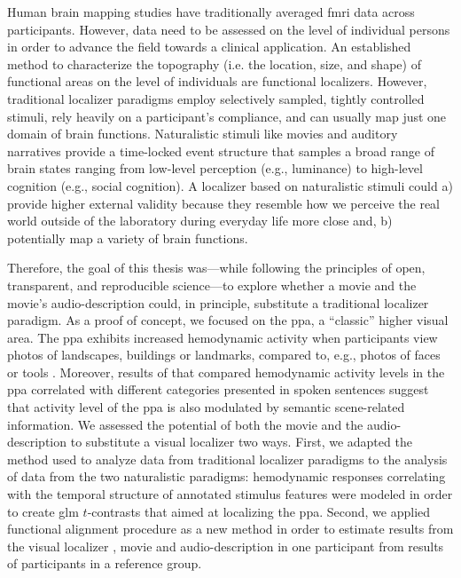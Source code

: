 

Human brain mapping studies have traditionally averaged \ac{fmri} data across
participants.
%
However, data need to be assessed on the level of individual persons in order to
advance the field towards a clinical application.
An established method to characterize the topography (i.e. the location, size,
and shape) of functional areas on the level of individuals are functional
localizers.
However, traditional localizer paradigms employ selectively sampled, tightly
controlled stimuli, rely heavily on a participant's compliance, and can usually
map just one domain of brain functions.
Naturalistic stimuli like movies and auditory narratives \citep[cf.][for
reviews]{jaaskelainen2021movies, jaaskelainen2020neural} provide a time-locked
event structure that samples a broad range of brain states ranging from
low-level perception (e.g., luminance) to high-level cognition (e.g., social
cognition).
%
A localizer based on naturalistic stimuli could
%
a) provide higher external validity because they resemble how we perceive the
real world outside of the laboratory during everyday life more close and,
%
b) potentially map a variety of brain functions.

Therefore, the goal of this thesis was---while following the principles of open,
transparent, and reproducible science---to explore whether a movie and the
movie's audio-description could, in principle, substitute a traditional
localizer paradigm.
As a proof of concept, we focused on the \ac{ppa}, a ``classic'' higher visual
area.
%
The \ac{ppa} exhibits increased hemodynamic activity when participants view
photos of landscapes, buildings or landmarks, compared to, e.g., photos of faces
or tools \citep[e.g.,][for reviews]{epstein2014neural, aminoff2013role}.
%
Moreover, results of \citet{aziz2008modulation} that compared hemodynamic
activity levels in the \ac{ppa} correlated with different categories presented
in spoken sentences suggest that activity level of the \ac{ppa} is also
modulated by semantic scene-related information.
%
We assessed the potential of both the movie and the audio-description to
substitute a visual localizer two ways.
First, we adapted the method used to analyze data from traditional localizer
paradigms to the analysis of data from the two naturalistic paradigms:
%
hemodynamic responses correlating with the temporal structure of annotated
stimulus features \citep[cf.][]{haeusler2016cutanno, haeusler2021speechanno}
were modeled in order to create \ac{glm} $t$-contrasts that aimed at localizing
the \ac{ppa}.
Second, we applied functional alignment procedure as a new method in order to
estimate results from the visual localizer \citep[cf.][]{sengupta2016extension},
movie and audio-description \citep[cf.][]{haeusler2022processing} in one
participant from results of participants in a reference group.


